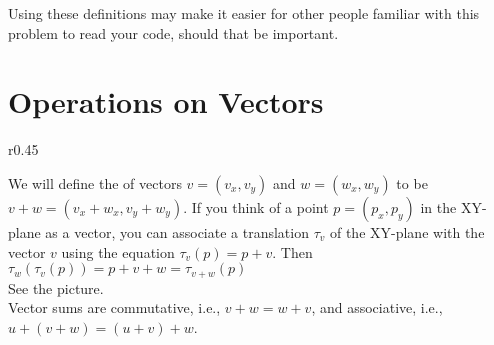 \documentclass[12pt]{article}
\begin{document}
Using these definitions may make it easier
for other people familiar with this problem to read your
code, should that be important.

\section{Operations on Vectors}
\begin{minipage}{\textwidth}\raggedright
\begin{wrapfigure}{r}{0.45\textwidth}
\end{wrapfigure}
We will define the  of vectors $v=(v_x,v_y)$ and
$w=(w_x,w_y)$ to be $v+w=(v_x+w_x,v_y+w_y)$.  If you
think of a point $p=(p_x,p_y)$ in the XY-plane as a vector,
you can associate a translation $\tau_v$ of the XY-plane
with the vector $v$ using the equation $\tau_v(p)=p+v$.  Then\\
\hspace*{0.2in}$\tau_w(\tau_v(p)) = p+v+w = \tau_{v+w}(p)$ \\
See the picture.
\\[1ex]
Vector sums are commutative, i.e.,  $v+w=w+v$, and associative,
i.e., $u+(v+w)=(u+v)+w$.
\end{minipage}

\bigskip
\end{document}
